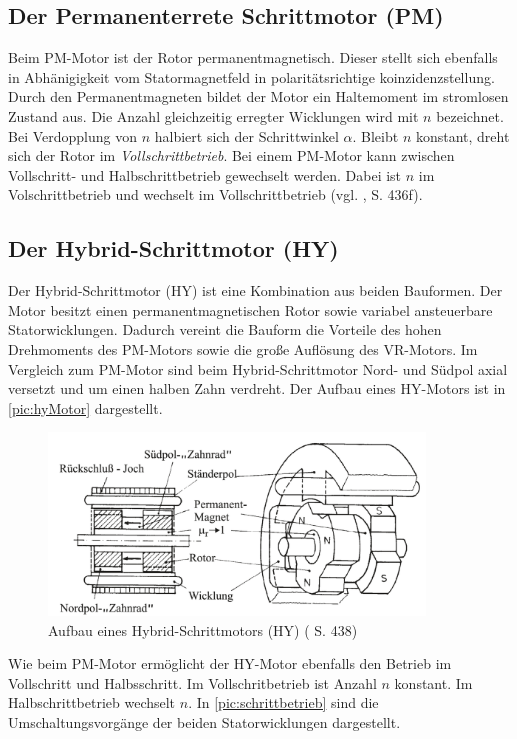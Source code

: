 \subsection{Der Permanenterrete Schrittmotor (PM)}
Beim PM-Motor ist der Rotor permanentmagnetisch. Dieser stellt sich ebenfalls in Abhänigigkeit vom Statormagnetfeld in polaritätsrichtige \acrshort{koinzidenzstellung}. Durch den Permanentmagneten bildet der Motor ein Haltemoment im stromlosen Zustand aus. Die Anzahl gleichzeitig erregter Wicklungen wird mit $n$ bezeichnet. Bei Verdopplung von $n$ halbiert sich der Schrittwinkel $\alpha$. Bleibt $n$ konstant, dreht sich der Rotor im \textit{Vollschrittbetrieb}. Bei einem PM-Motor kann zwischen Vollschritt- und Halbschrittbetrieb gewechselt werden. Dabei ist $n$ im Volschrittbetrieb und wechselt im Vollschrittbetrieb (vgl. \cite{kleinantriebe}, S. 436f). \newpage

\subsection{Der Hybrid-Schrittmotor (HY)}
Der Hybrid-Schrittmotor (HY) ist eine Kombination aus beiden Bauformen. Der Motor besitzt einen permanentmagnetischen Rotor sowie variabel ansteuerbare Statorwicklungen. Dadurch vereint die Bauform die Vorteile des hohen Drehmoments des PM-Motors sowie die große Auflösung des VR-Motors. Im Vergleich zum PM-Motor sind beim Hybrid-Schrittmotor Nord- und Südpol axial versetzt und um einen halben Zahn verdreht. Der Aufbau eines HY-Motors ist in \autoref{pic:hyMotor} dargestellt. 


\begin{figure}[h]
	\begin{center}
		\includegraphics[width=10cm]{hyMotor.png}
		\caption{Aufbau eines Hybrid-Schrittmotors (HY) (\cite{kleinantriebe} S. 438)}
		\label{pic:hyMotor}
	\end{center}
\end{figure}

\newpage
Wie beim PM-Motor ermöglicht der HY-Motor ebenfalls den Betrieb im Vollschritt und Halbsschritt. Im Vollschritbetrieb ist Anzahl $n$ konstant. Im Halbschrittbetrieb wechselt $n$. In \autoref{pic:schrittbetrieb} sind die Umschaltungsvorgänge der beiden Statorwicklungen dargestellt. 

